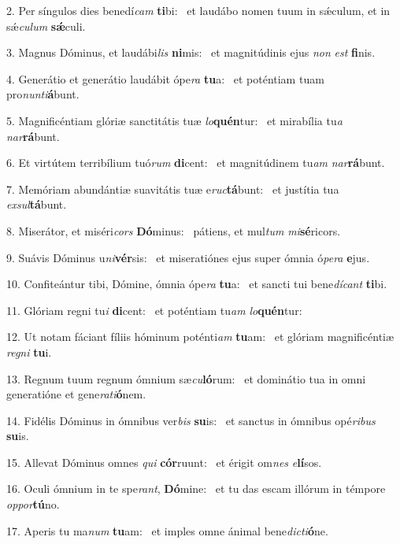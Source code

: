 2. Per síngulos dies benedí\textit{cam} \textbf{ti}bi: \ast\  et laudábo nomen tuum in sǽculum, et in sǽ\textit{cu}\textit{lum} \textbf{sǽ}culi.\

3. Magnus Dóminus, et laudábi\textit{lis} \textbf{ni}mis: \ast\  et magnitúdinis ejus \textit{non} \textit{est} \textbf{fi}nis.\

4. Generátio et generátio laudábit ópe\textit{ra} \textbf{tu}a: \ast\  et poténtiam tuam pro\textit{nun}\textit{ti}\textbf{á}bunt.\

5. Magnificéntiam glóriæ sanctitátis tuæ \textit{lo}\textbf{quén}tur: \ast\  et mirabília tu\textit{a} \textit{nar}\textbf{rá}bunt.\

6. Et virtútem terribílium tuó\textit{rum} \textbf{di}cent: \ast\  et magnitúdinem tu\textit{am} \textit{nar}\textbf{rá}bunt.\

7. Memóriam abundántiæ suavitátis tuæ e\textit{ruc}\textbf{tá}bunt: \ast\  et justítia tua \textit{ex}\textit{sul}\textbf{tá}bunt.\

8. Miserátor, et miséri\textit{cors} \textbf{Dó}minus: \ast\  pátiens, et mul\textit{tum} \textit{mi}\textbf{sé}ricors.\

9. Suávis Dóminus u\textit{ni}\textbf{vér}sis: \ast\  et miseratiónes ejus super ómnia ó\textit{pe}\textit{ra} \textbf{e}jus.\

10. Confiteántur tibi, Dómine, ómnia ópe\textit{ra} \textbf{tu}a: \ast\  et sancti tui bene\textit{dí}\textit{cant} \textbf{ti}bi.\

11. Glóriam regni tu\textit{i} \textbf{di}cent: \ast\  et poténtiam tu\textit{am} \textit{lo}\textbf{quén}tur:\

12. Ut notam fáciant fíliis hóminum poténti\textit{am} \textbf{tu}am: \ast\  et glóriam magnificéntiæ \textit{re}\textit{gni} \textbf{tu}i.\

13. Regnum tuum regnum ómnium sæ\textit{cu}\textbf{ló}rum: \ast\  et dominátio tua in omni generatióne et gene\textit{ra}\textit{ti}\textbf{ó}nem.\

14. Fidélis Dóminus in ómnibus ver\textit{bis} \textbf{su}is: \ast\  et sanctus in ómnibus opé\textit{ri}\textit{bus} \textbf{su}is.\

15. Allevat Dóminus omnes \textit{qui} \textbf{cór}ruunt: \ast\  et érigit om\textit{nes} \textit{e}\textbf{lí}sos.\

16. Oculi ómnium in te spe\textit{rant}, \textbf{Dó}mine: \ast\  et tu das escam illórum in témpore \textit{op}\textit{por}\textbf{tú}no.\

17. Aperis tu ma\textit{num} \textbf{tu}am: \ast\  et imples omne ánimal bene\textit{dic}\textit{ti}\textbf{ó}ne.\

